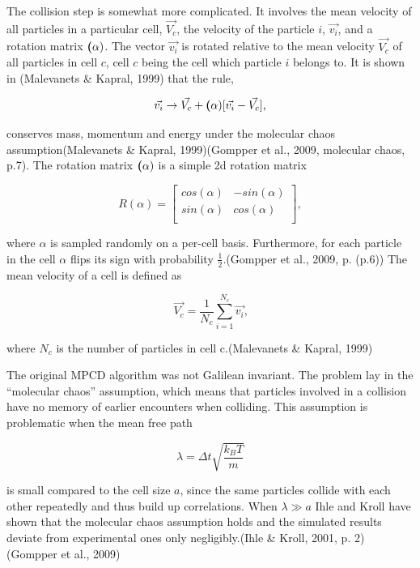 \documentclass[
]{article}
\begin{document}
The collision step is somewhat more complicated. It involves the mean
velocity of all particles in a particular cell, \(\vec{V_c}\), the
velocity of the particle \(i\), \(\vec{v_i}\), and a rotation matrix
\(\textbf(\alpha)\). The vector \(\vec{v_i}\) is rotated relative to the
mean velocity \(\vec{V_c}\) of all particles in cell \(c\), cell \(c\)
being the cell which particle \(i\) belongs to. It is shown in
(Malevanets \& Kapral, 1999) that the rule,

\begin{equation}
\vec{v_i} \rightarrow \vec{V_c} + \textbf(\alpha) [\vec{v_i} - \vec{V_c}] \textrm{,}
\end{equation}

conserves mass, momentum and energy under the molecular chaos
assumption(Malevanets \& Kapral, 1999)(Gompper et al., 2009, molecular
chaos, p.7). The rotation matrix \(\textbf(\alpha)\) is a simple 2d
rotation matrix

\begin{equation}
R(\alpha) = 
\left[ \begin{array}{rr}
cos(\alpha) & -sin(\alpha) \\
sin(\alpha) & cos(\alpha) \\
\end{array}\right],
\end{equation}

where \(\alpha\) is sampled randomly on a per-cell basis. Furthermore,
for each particle in the cell \(\alpha\) flips its sign with probability
\(\frac{1}{2}\).(Gompper et al., 2009, p. (p.6)) The mean velocity of a
cell is defined as

\begin{equation}
\vec{V_c} = \frac{1}{N_c} \sum_{i=1}^{N_c} \vec{v_i} \textrm{,}
\end{equation}

where \(N_c\) is the number of particles in cell c.(Malevanets \&
Kapral, 1999)

The original MPCD algorithm was not Galilean invariant. The problem lay
in the ``molecular chaos'' assumption, which means that particles
involved in a collision have no memory of earlier encounters when
colliding. This assumption is problematic when the mean free path

\begin{equation}
\lambda = \Delta t \sqrt{\frac{k_{B}T}{m}}
\end{equation}

is small compared to the cell size \(a\), since the same particles
collide with each other repeatedly and thus build up correlations. When
\(\lambda \gg a\) Ihle and Kroll have shown that the molecular chaos
assumption holds and the simulated results deviate from experimental
ones only negligibly.(Ihle \& Kroll, 2001, p. 2)(Gompper et al., 2009)
\end{document}
